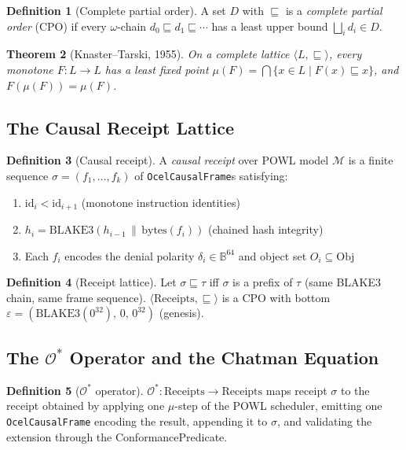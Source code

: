 \documentclass[12pt,a4paper]{article}
\newtheorem{theorem}{Theorem}[section]
\theoremstyle{definition}
\newtheorem{definition}[theorem]{Definition}
\theoremstyle{remark}
\newcommand{\B}{\mathbb{B}}
\newcommand{\Ostar}{\mathcal{O}^{*}}
\newcommand{\Lattice}[1]{\langle #1 \rangle}
\begin{document}
\begin{definition}[Complete partial order]
A set $D$ with $\sqsubseteq$ is a \emph{complete partial order} (CPO) if every
$\omega$-chain $d_0 \sqsubseteq d_1 \sqsubseteq \cdots$ has a least upper bound
$\bigsqcup_i d_i \in D$.
\end{definition}

\begin{theorem}[Knaster--Tarski, 1955]
\label{thm:kt}
On a complete lattice $\Lattice{L,\sqsubseteq}$, every monotone $F: L \to L$ has a
least fixed point $\mu(F) = \bigcap\{x \in L \mid F(x) \sqsubseteq x\}$,
and $F(\mu(F)) = \mu(F)$.
\end{theorem}

\subsection{The Causal Receipt Lattice}

\begin{definition}[Causal receipt]
A \emph{causal receipt} over POWL model $\mathcal{M}$ is a finite sequence
$\sigma = (f_1, \ldots, f_k)$ of \texttt{OcelCausalFrame}s satisfying:
\begin{enumerate}[noitemsep]
  \item $\mathrm{id}_i < \mathrm{id}_{i+1}$ (monotone instruction identities)
  \item $h_i = \mathrm{BLAKE3}(h_{i-1} \,\|\, \mathrm{bytes}(f_i))$
        (chained hash integrity)
  \item Each $f_i$ encodes the denial polarity $\delta_i \in \B^{64}$
        and object set $O_i \subseteq \mathrm{Obj}$
\end{enumerate}
\end{definition}

\begin{definition}[Receipt lattice]
Let $\sigma \sqsubseteq \tau$ iff $\sigma$ is a prefix of $\tau$
(same BLAKE3 chain, same frame sequence).
$\Lattice{\mathrm{Receipts}, \sqsubseteq}$ is a CPO with bottom
$\varepsilon = (\mathrm{BLAKE3}(0^{32}),\, 0,\, 0^{32})$ (genesis).
\end{definition}

\subsection{The \texorpdfstring{$\Ostar$}{O*} Operator and the Chatman Equation}

\begin{definition}[$\Ostar$ operator]
$\Ostar : \mathrm{Receipts} \to \mathrm{Receipts}$ maps receipt $\sigma$ to the
receipt obtained by applying one $\mu$-step of the POWL scheduler, emitting one
\texttt{OcelCausalFrame} encoding the result, appending it to $\sigma$,
and validating the extension through the ConformancePredicate.
\end{definition}
\end{document}
